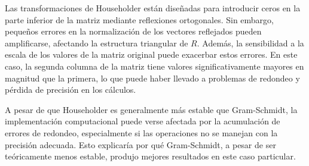\begin{homeworkProblem}
\begin{itemize}
\begin{solucion}
Las transformaciones de Householder están diseñadas para introducir ceros en la parte inferior de la matriz mediante reflexiones ortogonales. Sin embargo, pequeños errores en la normalización de los vectores reflejados pueden amplificarse, afectando la estructura triangular de \( R \). Además, la sensibilidad a la escala de los valores de la matriz original puede exacerbar estos errores. En este caso, la segunda columna de la matriz tiene valores significativamente mayores en magnitud que la primera, lo que puede haber llevado a problemas de redondeo y pérdida de precisión en los cálculos.

A pesar de que Householder es generalmente más estable que Gram-Schmidt, la implementación computacional puede verse afectada por la acumulación de errores de redondeo, especialmente si las operaciones no se manejan con la precisión adecuada. Esto explicaría por qué Gram-Schmidt, a pesar de ser teóricamente menos estable, produjo mejores resultados en este caso particular.  
        \end{solucion}
    \end{itemize}
\end{homeworkProblem}
